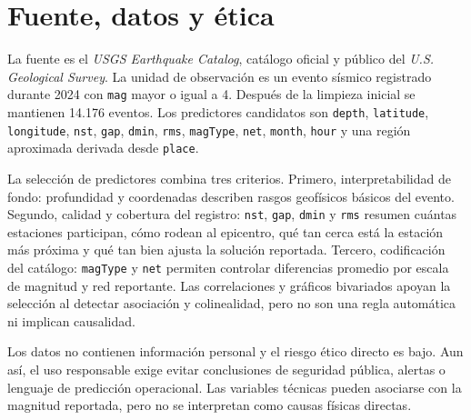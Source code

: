 \documentclass{style}
\newcommand{\var}[1]{\texttt{#1}}
\newcommand{\reporttablesize}{\footnotesize}
\begin{document}
\section{Fuente, datos y ética}

La fuente es el \textit{USGS Earthquake Catalog}, catálogo oficial y público del \textit{U.S. Geological Survey}. La unidad de observación es un evento sísmico registrado durante 2024 con \var{mag} mayor o igual a 4. Después de la limpieza inicial se mantienen 14.176 eventos. Los predictores candidatos son \var{depth}, \var{latitude}, \var{longitude}, \var{nst}, \var{gap}, \var{dmin}, \var{rms}, \var{magType}, \var{net}, \var{month}, \var{hour} y una región aproximada derivada desde \var{place}.

La selección de predictores combina tres criterios. Primero, interpretabilidad de fondo: profundidad y coordenadas describen rasgos geofísicos básicos del evento. Segundo, calidad y cobertura del registro: \var{nst}, \var{gap}, \var{dmin} y \var{rms} resumen cuántas estaciones participan, cómo rodean al epicentro, qué tan cerca está la estación más próxima y qué tan bien ajusta la solución reportada. Tercero, codificación del catálogo: \var{magType} y \var{net} permiten controlar diferencias promedio por escala de magnitud y red reportante. Las correlaciones y gráficos bivariados apoyan la selección al detectar asociación y colinealidad, pero no son una regla automática ni implican causalidad.

{\reporttablesize

}

Los datos no contienen información personal y el riesgo ético directo es bajo. Aun así, el uso responsable exige evitar conclusiones de seguridad pública, alertas o lenguaje de predicción operacional. Las variables técnicas pueden asociarse con la magnitud reportada, pero no se interpretan como causas físicas directas.
\end{document}
